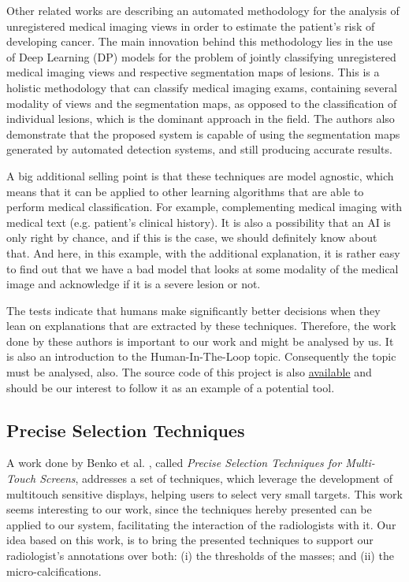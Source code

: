 Other related works \cite{giger2013breast, carneiro2017automated} are describing an automated methodology for the analysis of unregistered medical imaging views in order to estimate the patient's risk of developing cancer. The main innovation behind this methodology lies in the use of Deep Learning (DP) models for the problem of jointly classifying unregistered medical imaging views and respective segmentation maps of lesions. This is a holistic methodology that can classify medical imaging exams, containing several modality of views and the segmentation maps, as opposed to the classification of individual lesions, which is the dominant approach in the field. The authors also demonstrate that the proposed system is capable of using the segmentation maps generated by automated detection systems, and still producing accurate results.

\clearpage

A big additional selling point is that these techniques are model agnostic, which means that it can be applied to other learning algorithms that are able to perform medical classification. For example, complementing medical imaging with medical text (e.g. patient's clinical history). It is also a possibility that an AI is only right by chance, and if this is the case, we should definitely know about that. And here, in this example, with the additional explanation, it is rather easy to find out that we have a bad model that looks at some modality of the medical image and acknowledge if it is a severe lesion or not.

The tests indicate that humans make significantly better decisions when they lean on explanations that are extracted by these techniques. Therefore, the work done by these authors is important to our work and might be analysed by us. It is also an introduction to the Human-In-The-Loop topic. Consequently the topic must be analysed, also. The source code of this project is also \href{https://github.com/marcotcr/lime}{available} and should be our interest to follow it as an example of a potential tool.

\subsection{Precise Selection Techniques}

A work done by Benko et al. \cite{benko2006precise}, called \textit{Precise Selection Techniques for Multi-Touch Screens}, addresses a set of techniques, which leverage the development of multitouch sensitive displays, helping users to select very small targets. This work seems interesting to our work, since the techniques hereby presented can be applied to our system, facilitating the interaction of the radiologists with it. Our idea based on this work, is to bring the presented techniques to support our radiologist's annotations over both: (i) the thresholds of the masses; and (ii) the micro-calcifications.

